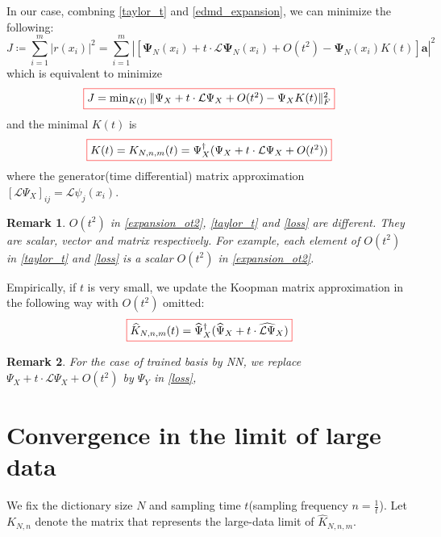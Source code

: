 \documentclass{article}[11]
\newtheorem*{remark}{Remark}
\begin{document}
	In our case, combning \eqref{taylor_t} and \eqref{edmd_expansion}, we can minimize the following:
	\begin{equation*}
		J \coloneqq \sum_{i=1}^m \left| r(x_i) \right|^2 = \sum_{i=1}^m \left| \left[\mathbf{\Psi}_N(x_i) + t \cdot \mathcal{L}\mathbf{\Psi}_N(x_i) + O(t^2) - \mathbf{\Psi}_N(x_i)K(t)\right]\mathbf{a} \right|^2
	\end{equation*}
	which is equivalent to minimize 
	\begin{equation}\label{loss}
		\fcolorbox{red}{white}{$J = \min_{K(t)} \| \Psi_X + t \cdot \mathcal{L}\Psi_X + O(t^2) - \Psi_X K(t) \|_F^2$}
	\end{equation}
	and the minimal $K(t)$ is
	\begin{equation}\label{Koopman_semigroup_formula}
		\fcolorbox{red}{white}{$K(t) = K_{N,n,m}(t) = \Psi_X^{\dagger}(\Psi_X + t \cdot \mathcal{L}\Psi_X + O(t^2))$}
	\end{equation}
	where the generator(time differential) matrix approximation $\left[\mathcal{L}\Psi_X\right]_{ij} = \mathcal{L}\psi_j(x_i)$. 
	\begin{remark}
		$O(t^2)$ in \eqref{expansion_ot2}, \eqref{taylor_t} and \eqref{loss} are different. They are scalar, vector and matrix respectively. For example, each element of $O(t^2)$ in \eqref{taylor_t} and \eqref{loss} is a scalar $O(t^2)$ in \eqref{expansion_ot2}.
	\end{remark}
	
	Empirically, if $t$ is very small, we update the Koopman matrix approximation in the following way with $O(t^2)$ omitted:
	\begin{equation*}
		\fcolorbox{red}{white}{$\widehat{K}_{N,n,m}(t) = \widehat{\Psi}_X^{\dagger}(\widehat{\Psi}_X + t \cdot \widehat{\mathcal{L}\Psi}_X)$}
	\end{equation*}
	\begin{remark}
		For the case of trained basis by NN, we replace $\Psi_X + t \cdot \mathcal{L}\Psi_X + O(t^2)$ by $\Psi_Y$ in \eqref{loss}, 
	\end{remark}
	
	
	\newpage
	\section{Convergence in the limit of large data}
	We fix the dictionary size $N$ and sampling time $t$(sampling frequency $n=\frac{1}{t}$). Let \( K_{N,n} \) denote the matrix that represents the large-data limit of \( \widehat{K}_{N,n,m} \).
	\vspace{5mm}
	
\end{document}
